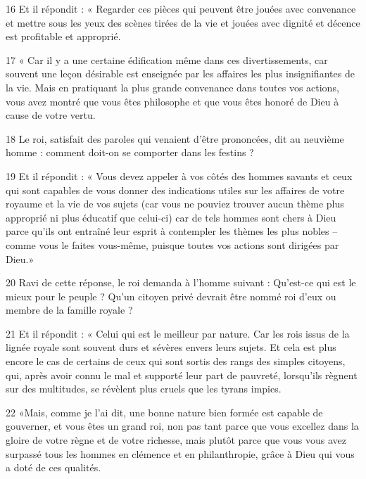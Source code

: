 \par 16 Et il répondit : « Regarder ces pièces qui peuvent être jouées avec convenance et mettre sous les yeux des scènes tirées de la vie et jouées avec dignité et décence est profitable et approprié.

\par 17 « Car il y a une certaine édification même dans ces divertissements, car souvent une leçon désirable est enseignée par les affaires les plus insignifiantes de la vie. Mais en pratiquant la plus grande convenance dans toutes vos actions, vous avez montré que vous êtes philosophe et que vous êtes honoré de Dieu à cause de votre vertu.

\par 18 Le roi, satisfait des paroles qui venaient d'être prononcées, dit au neuvième homme : comment doit-on se comporter dans les festins ?

\par 19 Et il répondit : « Vous devez appeler à vos côtés des hommes savants et ceux qui sont capables de vous donner des indications utiles sur les affaires de votre royaume et la vie de vos sujets (car vous ne pouviez trouver aucun thème plus approprié ni plus éducatif que celui-ci) car de tels hommes sont chers à Dieu parce qu’ils ont entraîné leur esprit à contempler les thèmes les plus nobles – comme vous le faites vous-même, puisque toutes vos actions sont dirigées par Dieu.»

\par 20 Ravi de cette réponse, le roi demanda à l'homme suivant : Qu'est-ce qui est le mieux pour le peuple ? Qu'un citoyen privé devrait être nommé roi d'eux ou membre de la famille royale ?

\par 21 Et il répondit : « Celui qui est le meilleur par nature. Car les rois issus de la lignée royale sont souvent durs et sévères envers leurs sujets. Et cela est plus encore le cas de certains de ceux qui sont sortis des rangs des simples citoyens, qui, après avoir connu le mal et supporté leur part de pauvreté, lorsqu'ils règnent sur des multitudes, se révèlent plus cruels que les tyrans impies.

\par 22 «Mais, comme je l'ai dit, une bonne nature bien formée est capable de gouverner, et vous êtes un grand roi, non pas tant parce que vous excellez dans la gloire de votre règne et de votre richesse, mais plutôt parce que vous vous avez surpassé tous les hommes en clémence et en philanthropie, grâce à Dieu qui vous a doté de ces qualités.

